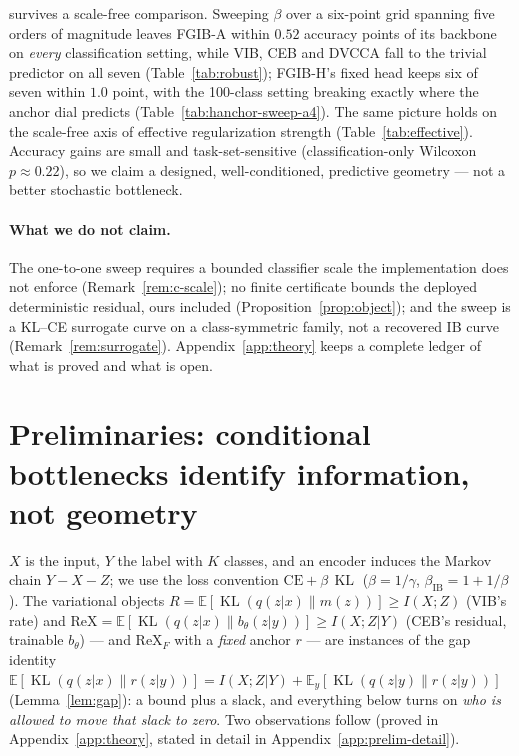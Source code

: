 \documentclass{article} %
\newcommand{\KLd}{\operatorname{KL}}
\newcommand{\ReX}{\mathrm{ReX}}
\newcommand{\CE}{\mathrm{CE}}
\begin{document}
\begin{itemize}
{survives a scale-free comparison.}
Sweeping $\beta$ over a six-point grid spanning five orders of magnitude leaves FGIB-A
within $0.52$ accuracy points of its backbone on \emph{every} classification setting,
while VIB, CEB and DVCCA fall to the trivial predictor on all seven
(Table~\ref{tab:robust}); FGIB-H's fixed head keeps six of seven within $1.0$ point,
with the 100-class setting breaking exactly where the anchor dial predicts
(Table~\ref{tab:hanchor-sweep-a4}). The same picture holds on the scale-free axis of
effective regularization strength (Table~\ref{tab:effective}). Accuracy gains are
small and task-set-sensitive (classification-only Wilcoxon $p\approx0.22$), so we
claim a designed, well-conditioned, predictive geometry --- not a better stochastic
bottleneck.
\end{itemize}

\paragraph{What we do not claim.}
The one-to-one sweep requires a bounded classifier scale the implementation does not
enforce (Remark~\ref{rem:c-scale}); no finite certificate bounds the deployed
deterministic residual, ours included (Proposition~\ref{prop:object}); and the sweep
is a KL--CE surrogate curve on a class-symmetric family, not a recovered IB curve
(Remark~\ref{rem:surrogate}). Appendix~\ref{app:theory} keeps a complete ledger of
what is proved and what is open.

\section{Preliminaries: conditional bottlenecks identify information, not geometry}
\label{sec:prelim}

$X$ is the input, $Y$ the label with $K$ classes, and an encoder induces the Markov chain
$Y - X - Z$; we use the loss convention $\CE + \beta\,\KLd$ ($\beta = 1/\gamma$,
$\beta_{\mathrm{IB}} = 1 + 1/\beta$). The variational objects
$R = \mathbb{E}[\KLd(q(z|x)\|m(z))] \ge I(X;Z)$ (VIB's rate) and
$\ReX = \mathbb{E}[\KLd(q(z|x)\|b_\theta(z|y))] \ge I(X;Z|Y)$ (CEB's residual, trainable
$b_\theta$) --- and $\ReX_F$ with a \emph{fixed} anchor $r$ --- are instances of the gap
identity $\mathbb{E}[\KLd(q(z|x)\|r(z|y))] = I(X;Z|Y)
+ \mathbb{E}_y[\KLd(q(z|y)\|r(z|y))]$ (Lemma~\ref{lem:gap}): a bound plus a slack, and
everything below turns on \emph{who is allowed to move that slack to zero}. Two
observations follow (proved in Appendix~\ref{app:theory}, stated in detail in
Appendix~\ref{app:prelim-detail}).
\end{document}
